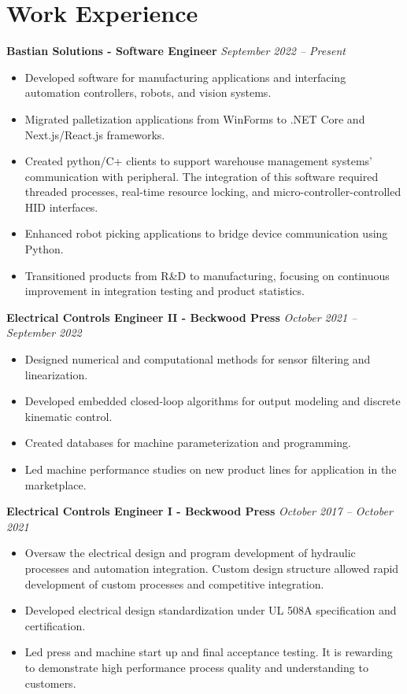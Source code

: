 \documentclass[letterpaper,10pt]{article} %
\newcommand{\job}[3]{
\textbf{#1 - #2} \hfill \textit{#3}
}
\begin{document}
\section{Work Experience}
\noindent\job{Bastian Solutions}{Software Engineer}{September 2022 -- Present}
\begin{itemize}[left=2em]
	\item Developed software for manufacturing applications and interfacing automation controllers, robots, and vision systems.
	\item Migrated palletization applications from WinForms to .NET Core and Next.js/React.js frameworks.
	\item Created python/C+ clients to support warehouse management systems' communication with peripheral. The integration of this software required threaded processes, real-time resource locking, and micro-controller-controlled HID interfaces.
	\item Enhanced robot picking applications to bridge device communication using Python.
	\item Transitioned products from R\&D to manufacturing, focusing on continuous improvement in integration testing and product statistics.
\end{itemize}

\noindent\job{Electrical Controls Engineer II}{Beckwood Press}{October 2021 – September 2022}
\begin{itemize}[left=2em]
	\item Designed numerical and computational methods for sensor filtering and linearization.
	\item Developed embedded closed-loop algorithms for output modeling and discrete kinematic control.
	\item Created databases for machine parameterization and programming.
	\item Led machine performance studies on new product lines for application in the marketplace.
\end{itemize}

\noindent\job{Electrical Controls Engineer I}{Beckwood Press}{October 2017 – October 2021}
\begin{itemize}[left=2em]
	\item Oversaw the electrical design and program development of hydraulic processes and automation integration. Custom design
	structure allowed rapid development of custom processes and competitive integration.
	\item Developed electrical design standardization under UL 508A specification and certification.
	\item Led press and machine start up and final acceptance testing. It is rewarding to demonstrate high performance process
	quality and understanding to customers.
\end{itemize}
	
\end{document}
